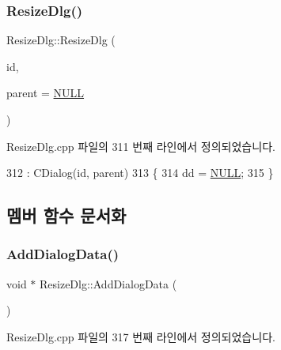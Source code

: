\subsubsection{\texorpdfstring{Resize\+Dlg()}{ResizeDlg()}}
{\footnotesize\ttfamily Resize\+Dlg\+::\+Resize\+Dlg (\begin{DoxyParamCaption}\item[{U\+I\+NT}]{id,  }\item[{C\+Wnd $\ast$}]{parent = {\ttfamily \mbox{\hyperlink{_system_8h_a070d2ce7b6bb7e5c05602aa8c308d0c4}{N\+U\+LL}}} }\end{DoxyParamCaption})}



Resize\+Dlg.\+cpp 파일의 311 번째 라인에서 정의되었습니다.


\begin{DoxyCode}
312   : CDialog(\textcolor{keywordtype}{id}, parent)
313 \{
314   dd = \mbox{\hyperlink{getopt1_8c_a070d2ce7b6bb7e5c05602aa8c308d0c4}{NULL}};
315 \}
\end{DoxyCode}


\subsection{멤버 함수 문서화}
\mbox{\label{class_resize_dlg_a5657ce3f83f261aceaf138cd1c69f0fc}} 
\subsubsection{\texorpdfstring{Add\+Dialog\+Data()}{AddDialogData()}}
{\footnotesize\ttfamily void $\ast$ Resize\+Dlg\+::\+Add\+Dialog\+Data (\begin{DoxyParamCaption}{ }\end{DoxyParamCaption})}



Resize\+Dlg.\+cpp 파일의 317 번째 라인에서 정의되었습니다.


